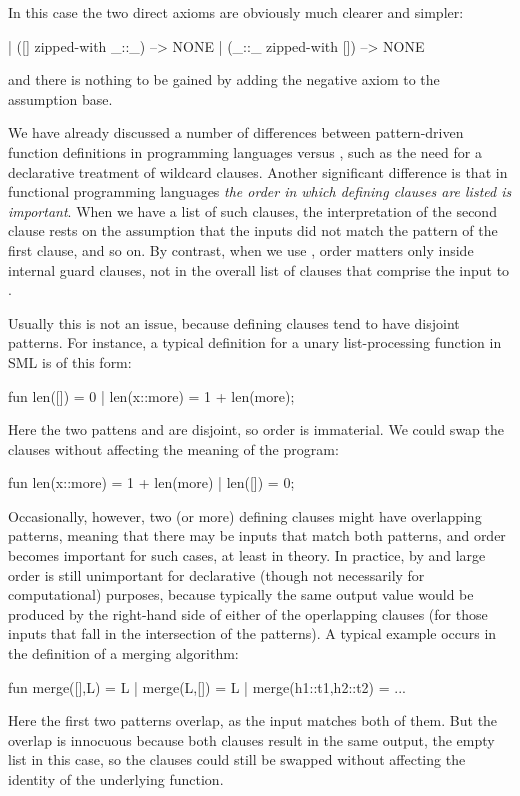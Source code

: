 In this case the two direct axioms are obviously much clearer and simpler: 
\begin{tcAthena}
| ([] zipped-with _::_) --> NONE
| (_::_ zipped-with []) --> NONE
\end{tcAthena}
and there is nothing to be gained by adding the negative axiom to the
assumption base.



We have already discussed a number of differences between 
pattern-driven function definitions in programming languages
versus , such as the need for a declarative 
treatment of wildcard clauses. Another significant difference is 
that in functional programming languages 
{\em the order in which defining clauses are listed is 
important}. When we have a list of such clauses, the interpretation 
of the second clause rests on the assumption that the inputs 
did not match the pattern of the first clause, and so on. 
By contrast, when we use , order matters only 
inside internal guard clauses, not in the overall list of 
clauses that comprise the input to . 

Usually this is not an issue, because defining clauses tend
to have disjoint patterns. For instance, a typical definition
for a unary list-processing function in SML is of this form:
\begin{tcAthena}
fun len([]) = 0
  | len(x::more) = 1 + len(more);
\end{tcAthena}
Here the two pattens \mtt{[]} and  are disjoint,
so order is immaterial. We could swap the clauses without
affecting the meaning of the program:
\begin{tcAthena}
fun len(x::more) = 1 + len(more)
  | len([]) = 0;
\end{tcAthena}
Occasionally, however, two (or more) defining clauses might have
overlapping patterns, meaning that there may be inputs that match 
both patterns, and order becomes important for such cases, at least 
in theory. In practice, by and large order is still unimportant 
for declarative (though not necessarily for computational) purposes, 
because typically the same output value 
would be produced by the right-hand side of either of the 
operlapping clauses (for those inputs that fall in the intersection 
of the patterns). A typical example occurs in the definition
of a merging algorithm:
\begin{tcAthena}
fun merge([],L) = L
  | merge(L,[]) = L
  | merge(h1::t1,h2::t2) = ... 
\end{tcAthena}
Here the first two patterns overlap, as the input \mtt{([],[])} 
matches both of them. But the overlap is innocuous because both
clauses result in the same output, the empty list \mtt{[]} in
this case, so the clauses could still be swapped without affecting
the identity of the underlying function. 

